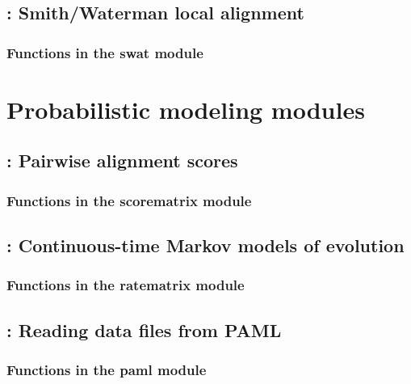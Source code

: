 \documentclass[10pt]{book}
\begin{document}
\newpage
\section{: Smith/Waterman local alignment}

\subsection{Functions in the swat module}




\chapter{Probabilistic modeling modules}

\newpage
\section{: Pairwise alignment scores}

\subsection{Functions in the scorematrix module}


\newpage
\section{: Continuous-time Markov models of evolution}

\subsection{Functions in the ratematrix module}


\newpage
\section{: Reading data files from PAML}

\subsection{Functions in the paml module}



\end{document}
